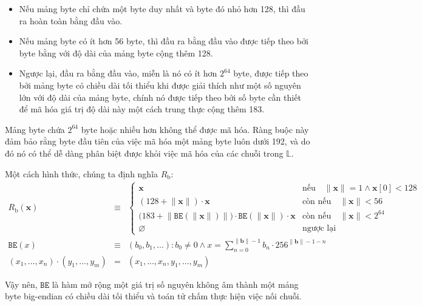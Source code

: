 \documentclass[9pt,oneside]{amsart}
\begin{document}
\begin{itemize}
\item Nếu mảng byte chỉ chứa một byte duy nhất và byte đó nhỏ hơn 128, thì đầu ra hoàn toàn bằng đầu vào.
\item Nếu mảng byte có ít hơn 56 byte, thì đầu ra bằng đầu vào được tiếp theo bởi byte bằng với độ dài của mảng byte cộng thêm 128.
\item Ngược lại, đầu ra bằng đầu vào, miễn là nó có ít hơn $2^{64}$ byte, được tiếp theo bởi mảng byte có chiều dài tối thiểu khi được giải thích như một số nguyên lớn với độ dài của mảng byte, chính nó được tiếp theo bởi số byte cần thiết để mã hóa giá trị độ dài này một cách trung thực cộng thêm 183.
\end{itemize}

Mảng byte chứa $2^{64}$ byte hoặc nhiều hơn không thể được mã hóa. Ràng buộc này đảm bảo rằng byte đầu tiên của việc mã hóa một mảng byte luôn dưới 192, và do đó nó có thể dễ dàng phân biệt được khỏi việc mã hóa của các chuỗi trong $\mathbb{L}$.

\hypertarget{RLP_serialisation_of_a_byte_array_R__b_math_def}{}Một cách hình thức, chúng ta định nghĩa $R_{\mathrm{b}}$:
\begin{eqnarray}
R_{\mathrm{b}}(\mathbf{x}) & \equiv & \begin{cases}
\mathbf{x} & \text{nếu} \quad \lVert \mathbf{x} \rVert = 1 \wedge \mathbf{x}[0] < 128 \\
(128 + \lVert \mathbf{x} \rVert) \cdot \mathbf{x} & \text{còn nếu} \quad \lVert \mathbf{x} \rVert < 56 \\
\big(183 + \big\lVert \mathtt{BE}(\lVert \mathbf{x} \rVert) \big\rVert \big) \cdot \mathtt{BE}(\lVert \mathbf{x} \rVert) \cdot \mathbf{x} & \text{còn nếu} \quad \lVert \mathbf{x} \rVert < 2^{64} \\
\varnothing & \text{ngược lại}
\end{cases} \\
\label{eq:BE}
\mathtt{BE}(x) & \equiv & (b_0, b_1, ...): b_0 \neq 0 \wedge x = \sum_{n = 0}^{\lVert \mathbf{b} \rVert - 1} b_n \cdot 256^{\lVert \mathbf{b} \rVert - 1 - n} \\
(x_1, ..., x_n) \cdot (y_1, ..., y_m) & = & (x_1, ..., x_n, y_1, ..., y_m)
\end{eqnarray}

Vậy nên, $\mathtt{BE}$ là hàm mở rộng một giá trị số nguyên không âm thành một mảng byte big-endian có chiều dài tối thiểu và toán tử chấm thực hiện việc nối chuỗi.
\end{document}
